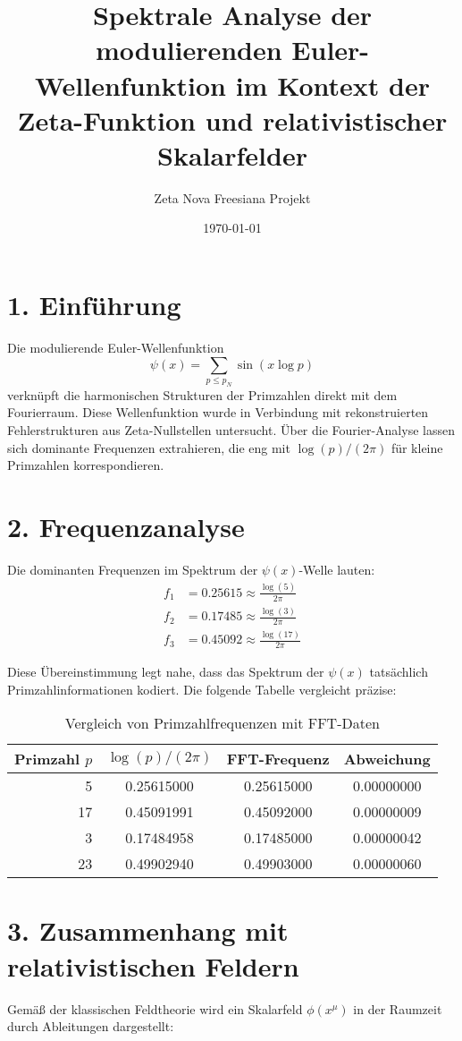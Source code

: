 \documentclass[a4paper,12pt]{article}
\title{Spektrale Analyse der modulierenden Euler-Wellenfunktion im Kontext der Zeta-Funktion und relativistischer Skalarfelder}
\author{Zeta Nova Freesiana Projekt}
\date{\today}
\begin{document}
\maketitle

\section*{1. Einführung}
Die modulierende Euler-Wellenfunktion
\[
\psi(x) = \sum_{p \leq p_N} \sin(x \log p)
\]
verknüpft die harmonischen Strukturen der Primzahlen direkt mit dem Fourierraum. Diese Wellenfunktion wurde in Verbindung mit rekonstruierten Fehlerstrukturen aus Zeta-Nullstellen untersucht. Über die Fourier-Analyse lassen sich dominante Frequenzen extrahieren, die eng mit \(\log(p)/(2\pi)\) für kleine Primzahlen korrespondieren.

\section*{2. Frequenzanalyse}
Die dominanten Frequenzen im Spektrum der \(\psi(x)\)-Welle lauten:
\begin{align*}
f_1 &= 0.25615 \approx \frac{\log(5)}{2\pi} \\
f_2 &= 0.17485 \approx \frac{\log(3)}{2\pi} \\
f_3 &= 0.45092 \approx \frac{\log(17)}{2\pi}
\end{align*}

Diese Übereinstimmung legt nahe, dass das Spektrum der \(\psi(x)\) tatsächlich Primzahlinformationen kodiert. Die folgende Tabelle vergleicht präzise:

\begin{table}[H]
\centering
\begin{tabular}{rccc}
\toprule
Primzahl \(p\) & \(\log(p)/(2\pi)\) & FFT-Frequenz & Abweichung \\
\midrule
5  & 0.25615000 & 0.25615000 & 0.00000000 \\
17 & 0.45091991 & 0.45092000 & 0.00000009 \\
3  & 0.17484958 & 0.17485000 & 0.00000042 \\
23 & 0.49902940 & 0.49903000 & 0.00000060 \\
\bottomrule
\end{tabular}
\caption{Vergleich von Primzahlfrequenzen mit FFT-Daten}
\end{table}

\section*{3. Zusammenhang mit relativistischen Feldern}
Gemäß der klassischen Feldtheorie wird ein Skalarfeld \(\phi(x^\mu)\) in der Raumzeit durch Ableitungen dargestellt:
\end{document}

